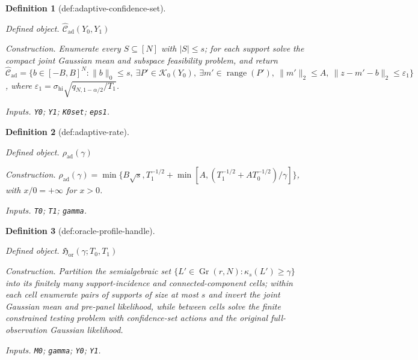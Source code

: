 \documentclass{article}
\newtheorem{definition}{Definition}
\begin{document}
\begin{definition}[def:adaptive-confidence-set]\label{def:adaptive-confidence-set}
\par\smallskip\noindent\emph{Defined object.} \(\widehat{\mathcal C}_{\mathrm{ad}}(Y_0,Y_1)\)
\par\smallskip\noindent\emph{Construction.} Enumerate every \(S\subseteq[N]\) with \(|S|\le s\); for each support solve the compact joint Gaussian mean and subspace feasibility problem, and return \(\widehat{\mathcal C}_{\mathrm{ad}}=\{b\in[-B,B]^N:\|b\|_0\le s,\ \exists P'\in\mathcal K_0(Y_0),\ \exists m'\in\operatorname{range}(P'),\ \|m'\|_2\le A,\ \|z-m'-b\|_2\le\varepsilon_1\}\), where \(\varepsilon_1=\sigma_{\mathrm{hi}}\sqrt{q_{N,1-\alpha/2}/T_1}\).
\par\smallskip\noindent\emph{Inputs.} \texttt{Y0}; \texttt{Y1}; \texttt{K0set}; \texttt{eps1}.
\end{definition}

\begin{definition}[def:adaptive-rate]\label{def:adaptive-rate}
\par\smallskip\noindent\emph{Defined object.} \(\rho_{\mathrm{ad}}(\gamma)\)
\par\smallskip\noindent\emph{Construction.} \(\rho_{\mathrm{ad}}(\gamma)=\min\{B\sqrt{s},T_1^{-1/2}+\min[A,(T_1^{-1/2}+AT_0^{-1/2})/\gamma]\}\), with \(x/0=+\infty\) for \(x>0\).
\par\smallskip\noindent\emph{Inputs.} \texttt{T0}; \texttt{T1}; \texttt{gamma}.
\end{definition}

\begin{definition}[def:oracle-profile-handle]\label{def:oracle-profile-handle}
\par\smallskip\noindent\emph{Defined object.} \(\mathfrak H_{\mathrm{or}}(\gamma;T_0,T_1)\)
\par\smallskip\noindent\emph{Construction.} Partition the semialgebraic set \(\{L'\in\operatorname{Gr}(r,N):\kappa_s(L')\ge\gamma\}\) into its finitely many support-incidence and connected-component cells; within each cell enumerate pairs of supports of size at most \(s\) and invert the joint Gaussian mean and pre-panel likelihood, while between cells solve the finite constrained testing problem with confidence-set actions and the original full-observation Gaussian likelihood.
\par\smallskip\noindent\emph{Inputs.} \texttt{M0}; \texttt{gamma}; \texttt{Y0}; \texttt{Y1}.
\end{definition}
\end{document}

